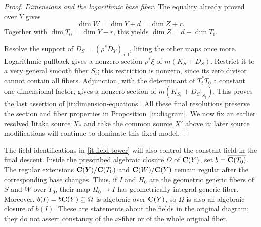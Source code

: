 \begin{proof}
\emph{Dimensions and the logarithmic base fiber.}
The equality already proved over $Y$ gives
\[
 \dim W=\dim Y+d=\dim Z+r.
\]
Together with $\dim T_0=\dim Y-r$, this yields
$\dim Z=d+\dim T_0$.

Resolve the support of $D_S=(\rho^*D_Y)_{\mathrm{red}}$, lifting the
other maps once more.  Logarithmic pullback gives a nonzero section
$\rho^*\xi$ of $m(K_S+D_S)$.  Restrict it to a very general smooth
fiber $S_t$; this restriction is nonzero, since its zero divisor
cannot contain all fibers.  Adjunction, with the determinant of
$T_t^*T_0$ a constant one-dimensional factor, gives a nonzero
section of $m(K_{S_t}+D_S|_{S_t})$.  This proves the last assertion
of \eqref{it:dimension-equations}.  All these final resolutions
preserve the section and fiber properties in
Proposition~\ref{it:diagram}.  We now fix an earlier resolved
Iitaka source $X_*$ and take the common source $X'$ above it;
later source modifications will continue to dominate this fixed
model.
\end{proof}

\begin{remark}\label{it:constant-field-interface}
The field identifications in \eqref{it:field-tower} will also control
the constant field in the final descent.  Inside the prescribed
algebraic closure $\Omega$ of $\mathbf C(Y)$, set
$b=\overline{\mathbf C(T_0)}$.  The regular extensions
$\mathbf C(Y)/\mathbf C(T_0)$ and $\mathbf C(W)/\mathbf C(Y)$ remain regular after the
corresponding base changes.  Thus, if $I$ and $H_0$ are the
geometric generic fibers of $S$ and $W$ over $T_0$, their map
$H_0\to I$ has geometrically integral generic fiber.  Moreover,
$b(I)=b\mathbf C(Y)\subseteq\Omega$ is algebraic over $\mathbf C(Y)$, so
$\Omega$ is also an algebraic closure of $b(I)$.  These are
statements about the fields in the original diagram; they do not
assert constancy of the $x$-fiber or of the whole original fiber.
\end{remark}
